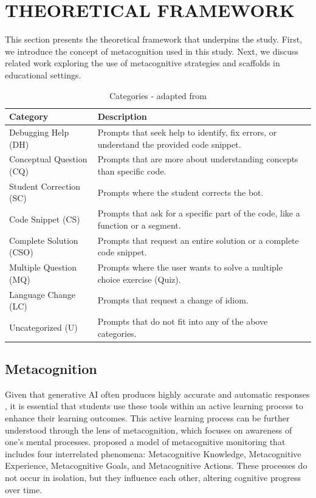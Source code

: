 \documentclass[a4paper,twoside]{article}
\begin{document}
\section{\uppercase{Theoretical Framework}}

This section presents the theoretical framework that underpins the study. First,
we introduce the concept of metacognition used in this study. Next, we discuss
related work exploring the use of metacognitive strategies and scaffolds
in educational settings.

\begin{table}[htbp]
  \caption{Categories - adapted from \cite{Ghimire24}}
  \begin{center}
    \renewcommand{\arraystretch}{1.6} %
    \begin{tabular}{p{4cm} p{12cm}} %
      \hline
      \textbf{Category} & \textbf{Description} \\
      \hline
      Debugging Help (DH) & Prompts that seek help to identify, fix errors, or understand the provided code snippet. \\
      Conceptual Question (CQ) & Prompts that are more about understanding concepts than specific code. \\
      Student Correction (SC) & Prompts where the student corrects the bot. \\
      Code Snippet  (CS) & Prompts that ask for a specific part of the code, like a function or a segment. \\
      Complete Solution (CSO) & Prompts that request an entire solution or a complete code snippet. \\
      Multiple Question (MQ) & Prompts where the user wants to solve a multiple choice exercise (Quiz). \\
      Language Change (LC) & Prompts that request a change of idiom. \\
      Uncategorized (U) & Prompts that do not fit into any of the above categories. \\
      \hline
    \end{tabular}
    \label{tab:categories}
  \end{center}
\end{table}

\subsection{Metacognition}

Given that generative AI often produces highly accurate and automatic responses
\citep{Puryear22}, it is essential that students use these tools within an
active learning process to enhance their learning outcomes. This active
learning process can be further understood through the lens of metacognition,
which focuses on awareness of one's mental processes. \cite{flavell79}
proposed a model of metacognitive monitoring that includes four interrelated
phenomena: Metacognitive Knowledge, Metacognitive Experience, Metacognitive
Goals, and Metacognitive Actions. These processes do not occur in isolation, but
they influence each other, altering cognitive progress over time.
\end{document}
